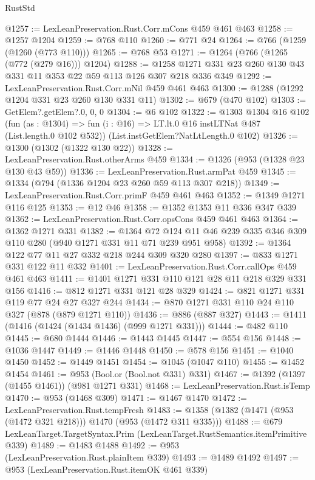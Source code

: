 \begin{lexlean}{RustStd}
\begin{coremodule}
@1257 := LexLeanPreservation.Rust.Corr.mCons @459 @461 @463
@1258 := @1257 @1204
@1259 := @768 @110
@1260 := @771 @24
@1264 := @766 (@1259 (@1260 (@773 @110)))
@1265 := @768 @53
@1271 := @1264 (@766 (@1265 (@772 (@279 @16))) @1204)
@1288 := @1258 @1271 @331 @23 @260 @130 @43 @331 @11 @353 @22 @59 @113 @126 @307 @218 @336 @349
@1292 := LexLeanPreservation.Rust.Corr.mNil @459 @461 @463
@1300 := @1288 (@1292 @1204 @331 @23 @260 @130 @331 @11)
@1302 := @679 (@470 @102)
@1303 := GetElem?.getElem?.{0, 0, 0}
@1304 := @6 @102
@1322 := @1303
    @1304
    @16
    @102
    (fun (as : @1304) => fun (i : @16) => LT.lt.{0} @16 instLTNat @487 (List.length.{0} @102 @532))
    (List.instGetElem?NatLtLength.{0} @102)
@1326 := @1300 (@1302 (@1322 @130 @22))
@1328 := LexLeanPreservation.Rust.otherArms @459
@1334 := @1326 (@953 (@1328 @23 @130 @43 @59))
@1336 := LexLeanPreservation.Rust.armPat @459
@1345 := @1334 (@794 (@1336 @1204 @23 @260 @59 @113 @307 @218))
@1349 := LexLeanPreservation.Rust.Corr.primF @459 @461 @463
@1352 := @1349 @1271 @116 @125
@1353 := @12 @46
@1358 := @1352 @1353 @11 @336 @347 @339
@1362 := LexLeanPreservation.Rust.Corr.opsCons @459 @461 @463
@1364 := @1362 @1271 @331
@1382 := @1364
    @72
    @124
    @11
    @46
    @239
    @335
    @346
    @309
    @110
    @280
    (@940 @1271 @331 @11 @71 @239 @951 @958)
@1392 := @1364 @122 @77 @11 @27 @332 @218 @244 @309 @320 @280
@1397 := @833 @1271 @331 @122 @11 @332
@1401 := LexLeanPreservation.Rust.Corr.callOps @459 @461 @463
@1411 := @1401 @1271 @331 @110 @121 @28 @11 @218 @329 @331 @156
@1416 := @812 @1271 @331 @121 @28 @329
@1424 := @821 @1271 @331 @119 @77 @24 @27 @327 @244
@1434 := @870 @1271 @331 @110 @24 @110 @327 (@878 (@879 @1271 @110))
@1436 := @886 (@887 @327)
@1443 := @1411 (@1416 (@1424 (@1434 @1436) (@999 @1271 @331)))
@1444 := @482 @110
@1445 := @680 @1444
@1446 := @1443 @1445
@1447 := @554 @156
@1448 := @1036 @1447
@1449 := @1446 @1448
@1450 := @578 @156
@1451 := @1040 @1450
@1452 := @1449 @1451
@1454 := @1045 (@1047 @110)
@1455 := @1452 @1454
@1461 := @953 (Bool.or (Bool.not @331) @331)
@1467 := @1392 (@1397 (@1455 @1461)) (@981 @1271 @331)
@1468 := LexLeanPreservation.Rust.isTemp
@1470 := @953 (@1468 @309)
@1471 := @1467 @1470
@1472 := LexLeanPreservation.Rust.tempFresh
@1483 := @1358 (@1382 (@1471 (@953 (@1472 @321 @218))) @1470 (@953 (@1472 @311 @335)))
@1488 := @679 LexLeanTarget.TargetSyntax.Prim (LexLeanTarget.RustSemantics.itemPrimitive @339)
@1489 := @1483 @1488
@1492 := @953 (LexLeanPreservation.Rust.plainItem @339)
@1493 := @1489 @1492
@1497 := @953 (LexLeanPreservation.Rust.itemOK @461 @339)

\end{coremodule}
\end{lexlean}

